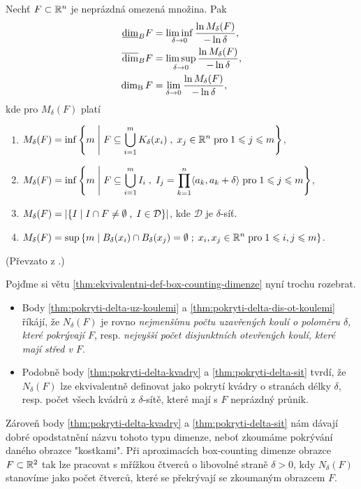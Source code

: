 \begin{theorem}\label{thm:ekvivalentni-def-box-counting-dimenze}
    Nechť $F\subset \mathbb{R}^n$ je neprázdná omezená množina. Pak
    \begin{align*}
        \underline{\dim}_B{F}&=\liminf_{\delta\to 0}\dfrac{\ln{M_\delta(F)}}{-\ln{\delta}},\\
        \overline{\dim}_B{F}&=\limsup_{\delta\to 0}\dfrac{\ln{M_\delta(F)}}{-\ln{\delta}},\\
        \operatorname{dim_B}{F}&=\lim_{\delta\to 0}\dfrac{\ln{M_\delta(F)}}{-\ln{\delta}},
    \end{align*}
    kde pro $M_\delta(F)$ platí
    \begin{enumerate}[label=(\roman*)]
        \item\label{thm:pokryti-delta-uz-koulemi} $\displaystyle M_\delta(F)=\inf\left\{m\;\middle|\;F\subseteq\bigcup\limits_{i=1}^m K_\delta(x_i)\;,\;x_j\in\mathbb{R}^n\;\text{pro}\;1\leqslant j\leqslant m\right\}$,
        \item\label{thm:pokryti-delta-kvadry} $\displaystyle M_\delta(F)=\inf\left\{m\;\middle|\;F\subseteq\bigcup\limits_{i=1}^m I_i\;,\;I_j=\prod_{k=1}^{n}\langle a_k,a_k+\delta\rangle\;\text{pro}\;1\leqslant j\leqslant m\right\}$,
        \item\label{thm:pokryti-delta-sit} $\displaystyle M_\delta(F)=\left|\left\{I\;\middle|\;I\cap F\neq\emptyset\;,\;I\in\mathcal{D}\right\}\right|$, kde $\mathcal{D}$ je $\delta$-síť.
        \item\label{thm:pokryti-delta-dis-ot-koulemi} $\displaystyle M_\delta(F)=\sup\left\{m\;\middle|\;B_\delta(x_i)\cap B_\delta(x_j)=\emptyset\;;\;x_i,x_j\in\mathbb{R}^n\;\text{pro}\;1\leqslant i,j\leqslant m\right\}$.
    \end{enumerate}
\end{theorem}
(Převzato z \citep[str. 30]{Falconer2014}.)

Pojďme si větu \ref{thm:ekvivalentni-def-box-counting-dimenze} nyní trochu rozebrat.
\begin{itemize}
    \item Body \ref{thm:pokryti-delta-uz-koulemi} a \ref{thm:pokryti-delta-dis-ot-koulemi} říkájí, že $N_\delta(F)$ je rovno \emph{nejmenšímu počtu uzavřených koulí o poloměru $\delta$, které pokrývají $F$}, resp. \emph{nejvyšší počet disjunktních otevřených koulí, které mají střed v $F$}.
    \item Podobně body \ref{thm:pokryti-delta-kvadry} a \ref{thm:pokryti-delta-sit} tvrdí, že $N_\delta(F)$ lze ekvivalentně definovat jako pokrytí kvádry o stranách délky $\delta$, resp. počet všech kvádrů z $\delta$-sítě, které mají s $F$ neprázdný průnik.
\end{itemize}

Zároveň body \ref{thm:pokryti-delta-kvadry} a \ref{thm:pokryti-delta-sit} nám dávají dobré opodstatnění názvu tohoto typu dimenze, neboť zkoumáme pokrývání daného obrazce "kostkami". Při aproximacích box-counting dimenze obrazce $F\subset\mathbb{R}^2$ tak lze pracovat s mřížkou čtverců o libovolné straně $\delta>0$, kdy $N_\delta(F)$ stanovíme jako počet čtverců, které se překrývají se zkoumaným obrazcem $F$.

